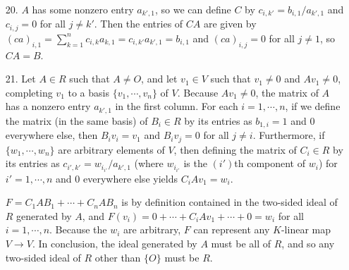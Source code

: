 \documentclass[12pt]{article}
\begin{document}
\begin{enumerate}
    \item[20.]
        $A$ has some nonzero entry $a_{k', 1}$, so we can define $C$ by $c_{i, k'} = b_{i, 1} / a_{k', 1}$ and $c_{i, j} = 0$ for all $j \neq k'$. Then the entries of $CA$ are given by $(ca)_{i, 1} = \sum_{k = 1}^n c_{i, k} a_{k, 1} = c_{i, k'} a_{k', 1} = b_{i, 1}$ and $(ca)_{i, j} = 0$ for all $j \neq 1$, so $CA = B$.

    \item[21.]
        Let $A \in R$ such that $A \neq O$, and let $v_1 \in V$ such that $v_1 \neq 0$ and $Av_1 \neq 0$, completing $v_1$ to a basis $\{ v_1, \cdots, v_n \}$ of $V$. Because $Av_1 \neq 0$, the matrix of $A$ has a nonzero entry $a_{k', 1}$ in the first column. For each $i = 1, \cdots, n$, if we define the matrix (in the same basis) of $B_i \in R$ by its entries as $b_{1, i} = 1$ and $0$ everywhere else, then $B_i v_i = v_1$ and $B_i v_j = 0$ for all $j \neq i$. Furthermore, if $\{ w_1, \cdots, w_n \}$ are arbitrary elements of $V$, then defining the matrix of $C_i \in R$ by its entries as $c_{i', k'} = w_{i_{i'}} / a_{k', 1}$ (where $w_{i_{i'}}$ is the $(i')$th component of $w_i$) for $i' = 1, \cdots, n$ and $0$ everywhere else yields $C_i Av_1 = w_i$. \par
        $F = C_1 A B_1 + \cdots + C_n A B_n$ is by definition contained in the two-sided ideal of $R$ generated by $A$, and $F(v_i) = 0 + \cdots + C_i Av_1 + \cdots + 0 = w_i$ for all $i = 1, \cdots, n$. Because the $w_i$ are arbitrary, $F$ can represent any $K$-linear map $V \to V$. In conclusion, the ideal generated by $A$ must be all of $R$, and so any two-sided ideal of $R$ other than $\{O\}$ must be $R$.

\end{enumerate}
\end{document}
